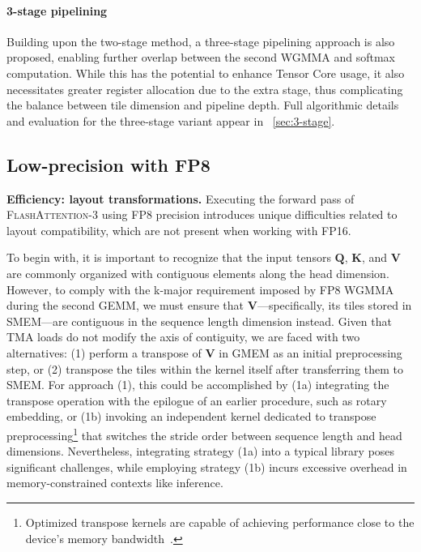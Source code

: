 \begin{enumerate}
\paragraph{3-stage pipelining} Building upon the two-stage method, a three-stage pipelining approach is also proposed, enabling further overlap between the second WGMMA and softmax computation. While this has the potential to enhance Tensor Core usage, it also necessitates greater register allocation due to the extra stage, thus complicating the balance between tile dimension and pipeline depth. Full algorithmic details and evaluation for the three-stage variant appear in ~\cref{sec:3-stage}.

\subsection{Low-precision with FP8}
\label{sec:algofp8}

\textbf{Efficiency: layout transformations.} Executing the forward pass of \textsc{FlashAttention-3} using FP8 precision introduces unique difficulties related to layout compatibility, which are not present when working with FP16.

To begin with, it is important to recognize that the input tensors $\mathbf{Q}$, $\mathbf{K}$, and $\mathbf{V}$ are commonly organized with contiguous elements along the head dimension. However, to comply with the k-major requirement imposed by FP8 WGMMA during the second GEMM, we must ensure that $\mathbf{V}$—specifically, its tiles stored in SMEM—are contiguous in the sequence length dimension instead. Given that TMA loads do not modify the axis of contiguity, we are faced with two alternatives: (1) perform a transpose of $\mathbf{V}$ in GMEM as an initial preprocessing step, or (2) transpose the tiles within the kernel itself after transferring them to SMEM. For approach (1), this could be accomplished by (1a) integrating the transpose operation with the epilogue of an earlier procedure, such as rotary embedding, or (1b) invoking an independent kernel dedicated to transpose preprocessing\footnote{Optimized transpose kernels are capable of achieving performance close to the device’s memory bandwidth~\citep{colfax_cutlass_transpose_2024}.} that switches the stride order between sequence length and head dimensions. Nevertheless, integrating strategy (1a) into a typical library poses significant challenges, while employing strategy (1b) incurs excessive overhead in memory-constrained contexts like inference.


\end{enumerate}
